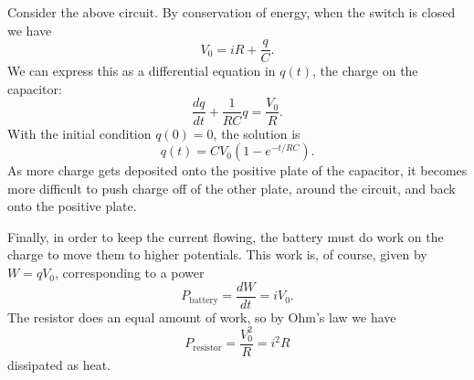 \documentclass[../p051main.tex]{subfiles}
\begin{document}
\begin{example}
    Consider the above circuit.
    By conservation of energy, when the switch is closed we have
    \[ V_0 = iR + \frac{q}{C}. \]
    We can express this as a differential equation in $q(t)$, the charge on the capacitor:
    \[ \frac{dq}{dt} + \frac{1}{RC}q = \frac{V_0}{R}. \]
    With the initial condition $q(0) = 0$, the solution is
    \[ q(t) = CV_0 \left( 1 - e^{-t / RC} \right). \]
    As more charge gets deposited onto the positive plate of the capacitor, it becomes more difficult to push charge off of the other plate, around the circuit, and back onto the positive plate.
\end{example}

Finally, in order to keep the current flowing, the battery must do work on the charge to move them to higher potentials.
This work is, of course, given by $W = qV_0$, corresponding to a power
\[ P_\textrm{battery} = \frac{dW}{dt} = iV_0. \]
The resistor does an equal amount of work, so by Ohm's law we have
\[ P_\textrm{resistor} = \frac{V_0^2}{R} = i^2R \]
dissipated as heat.

\end{document}
